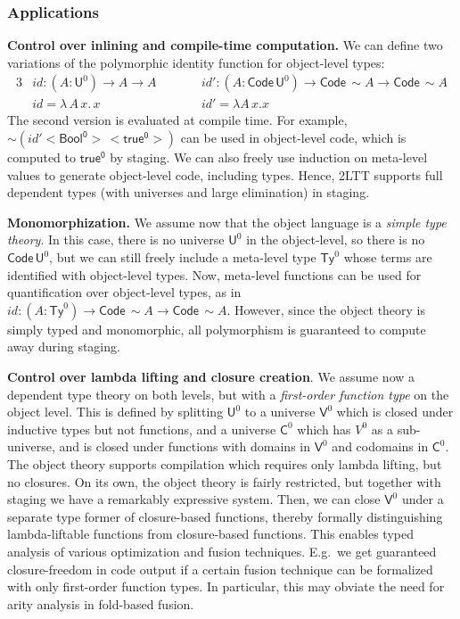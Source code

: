 \documentclass{easychair}
\newcommand{\U}{\mathsf{U}}
\newcommand{\Code}{\mathsf{Code}}
\newcommand{\Ty}{\mathsf{Ty}}
\newcommand{\V}{\mathsf{V}}
\newcommand{\C}{\mathsf{C}}
\begin{document}
\subsubsection*{Applications}

\textbf{Control over inlining and compile-time computation.} We can define two
variations of the polymorphic identity function for object-level types:
\begin{alignat*}{3}
  & \mathit{id} : (A : \U^0) \to A \to A \hspace{2em}&& \mathit{id'} : (A : \Code\,\U^0) \to \Code\,\sim\!A \to \Code\,\sim\!A\\
  & \mathit{id} = \lambda\,A\,x.\,x      && \mathit{id'} = \lambda A\,x.x
\end{alignat*}
The second version is evaluated at compile time. For example,
$\sim\!(\mathit{id'}<\!\mathsf{Bool^0}\!>\,<\!\mathsf{true^0}\!>)$ can be used
in object-level code, which is computed to $\mathsf{true^0}$ by staging. We can
also freely use induction on meta-level values to generate object-level code,
including types. Hence, 2LTT supports full dependent types (with universes and
large elimination) in staging.

\textbf{Monomorphization.} We assume now that the object language is a
\emph{simple type theory}. In this case, there is no universe $\U^0$ in the
object-level, so there is no $\Code\,\U^0$, but we can still freely include a
meta-level type $\Ty^0$ whose terms are identified with object-level types. Now,
meta-level functions can be used for quantification over object-level types, as in
$\mathit{id} : (A : \Ty^0) \to \Code\,\sim\!A \to \Code\,\sim\!A$. However,
since the object theory is simply typed and monomorphic, all polymorphism is
guaranteed to compute away during staging.

\textbf{Control over lambda lifting and closure creation}. We assume now a
dependent type theory on both levels, but with a \emph{first-order function
type} on the object level. This is defined by splitting $\U^0$ to a universe
$\V^0$ which is closed under inductive types but not functions, and a universe
$\C^0$ which has $V^0$ as a sub-universe, and is closed under functions with
domains in $\V^0$ and codomains in $\C^0$. The object theory supports
compilation which requires only lambda lifting, but no closures. On its own, the
object theory is fairly restricted, but together with staging we have a
remarkably expressive system. Then, we can close $\V^0$ under a separate type
former of closure-based functions, thereby formally distinguishing
lambda-liftable functions from closure-based functions. This enables typed
analysis of various optimization and fusion techniques. E.g.\ we get guaranteed
closure-freedom in code output if a certain fusion technique can be formalized
with only first-order function types. In particular, this may obviate the need
for arity analysis \cite{DBLP:journals/cl/Breitner18} in fold-based fusion.
\end{document}
